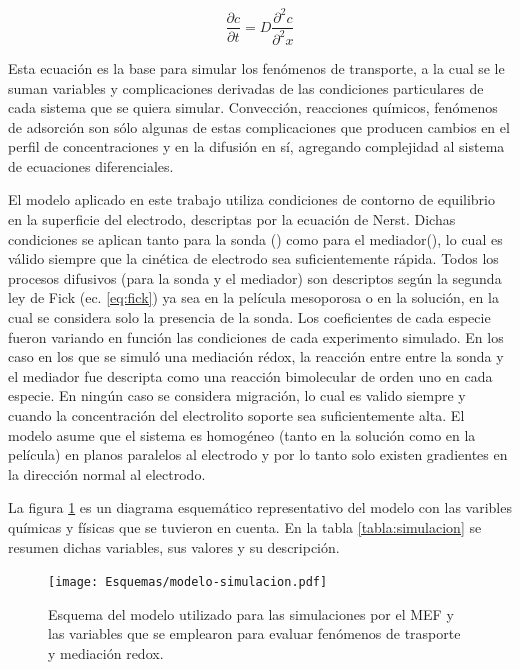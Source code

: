 	 	 \begin{equation}
	 	 	\frac{\partial c}{\partial t}=D\frac{\partial^2 c}{\partial^2 x}
	 	 	\label{eq:fick}
	 	 \end{equation}

	 	 Esta ecuación es la base para simular los fenómenos de transporte, a la cual se le suman variables y complicaciones derivadas de las condiciones particulares de cada sistema que se quiera simular. Convección, reacciones químicos, fenómenos de adsorción son sólo algunas de estas complicaciones que producen cambios en el perfil de concentraciones y en la difusión en sí, agregando complejidad al sistema de ecuaciones diferenciales.  

	 	 El modelo aplicado en este trabajo utiliza condiciones de contorno de equilibrio en la superficie del electrodo, descriptas por la ecuación de Nerst. Dichas condiciones se aplican tanto para la sonda (\fc) como para el mediador(\ru), lo cual es válido siempre que la cinética de electrodo sea suficientemente rápida. Todos los procesos difusivos (para la sonda y el mediador) son descriptos según la segunda ley de Fick (ec. \ref{eq:fick}) ya sea en la película mesoporosa o en la solución, en la cual se considera solo la presencia de la sonda. Los coeficientes de cada especie fueron variando en función las condiciones de cada experimento simulado. En los caso en los que se simuló una mediación rédox, la reacción entre entre la sonda y el mediador fue descripta como una reacción bimolecular de orden uno en cada especie. En ningún caso se considera migración, lo cual es valido siempre y cuando la concentración del electrolito soporte sea suficientemente alta. El modelo asume que el sistema es homogéneo (tanto en la solución como en la película) en planos paralelos al electrodo y por lo tanto solo existen gradientes en la dirección normal al electrodo. 

	 	 La figura \ref{esq:simulacion} es un diagrama esquemático representativo del modelo con las varibles químicas y físicas que se tuvieron en cuenta. En la tabla \ref{tabla:simulacion} se resumen dichas variables, sus valores y su descripción.

	 			 \begin{figure}[b!]
			 		  \begin{center}
			 		  \texttt{[image: Esquemas/modelo-simulacion.pdf]}
			 		  \caption[Modelos para simulación por MEF]{Esquema del modelo utilizado para las simulaciones por el MEF y las variables que se emplearon para evaluar fenómenos de trasporte y mediación redox.}
			 		  \label{esq:simulacion}
			 		  \end{center}
			 		  \end{figure}	
	 		
